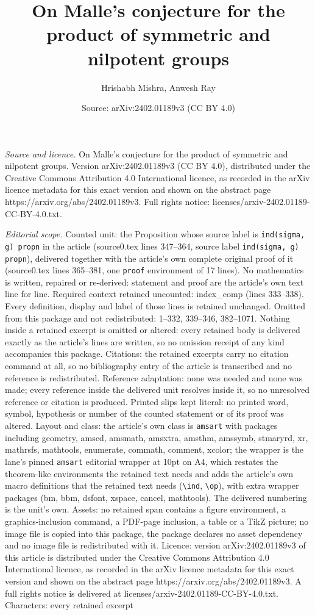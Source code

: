 \documentclass[10pt,a4paper]{amsart}
\title[On Malle's conjecture for the product of symmetric and nilpo]{On Malle's conjecture for the product of symmetric and nilpotent groups}
\author{Hrishabh Mishra, Anwesh Ray}
\date{Source: arXiv:2402.01189v3 (CC BY 4.0)}
\begin{document}
\maketitle

\noindent\emph{Source and licence.} On Malle's conjecture for the product of symmetric and nilpotent groups. Version arXiv:2402.01189v3 (CC BY 4.0), distributed under the Creative Commons Attribution 4.0 International licence, as recorded in the arXiv licence metadata for this exact version and shown on the abstract page https://arxiv.org/abs/2402.01189v3. Full rights notice: licenses/arxiv-2402.01189-CC-BY-4.0.txt.\par\smallskip

\noindent\textit{Editorial scope.} Counted unit: the Proposition whose source label is \texttt{ind(sigma, g) propn} in the article (source0.tex lines 347--364, source label \texttt{ind(sigma, g) propn}), delivered together with the article's own complete original proof of it (source0.tex lines 365--381, one \texttt{proof} environment of 17 lines). No mathematics is written, repaired or re-derived: statement and proof are the article's own text line for line. Required context retained uncounted: index\_comp (lines 333--338). Every definition, display and label of those lines is retained unchanged. Omitted from this package and not redistributed: 1--332, 339--346, 382--1071. Nothing inside a retained excerpt is omitted or altered: every retained body is delivered exactly as the article's lines are written, so no omission receipt of any kind accompanies this package. Citations: the retained excerpts carry no citation command at all, so no bibliography entry of the article is transcribed and no reference is redistributed. Reference adaptation: none was needed and none was made; every reference inside the delivered unit resolves inside it, so no unresolved reference or citation is produced. Printed slips kept literal: no printed word, symbol, hypothesis or number of the counted statement or of its proof was altered. Layout and class: the article's own class is \texttt{amsart} with packages including geometry, amscd, amsmath, amsxtra, amsthm, amssymb, stmaryrd, xr, mathrsfs, mathtools, enumerate, commath, comment, xcolor; the wrapper is the lane's pinned \texttt{amsart} editorial wrapper at 10pt on A4, which restates the theorem-like environments the retained text needs and adds the article's own macro definitions that the retained text needs (\texttt{\textbackslash ind}, \texttt{\textbackslash op}), with extra wrapper packages (bm, bbm, dsfont, xspace, cancel, mathtools). The delivered numbering is the unit's own. Assets: no retained span contains a figure environment, a graphics-inclusion command, a PDF-page inclusion, a table or a TikZ picture; no image file is copied into this package, the package declares no asset dependency and no image file is redistributed with it. Licence: version arXiv:2402.01189v3 of this article is distributed under the Creative Commons Attribution 4.0 International licence, as recorded in the arXiv licence metadata for this exact version and shown on the abstract page https://arxiv.org/abs/2402.01189v3. A full rights notice is delivered at licenses/arxiv-2402.01189-CC-BY-4.0.txt. Characters: every retained excerpt 
\end{document}
